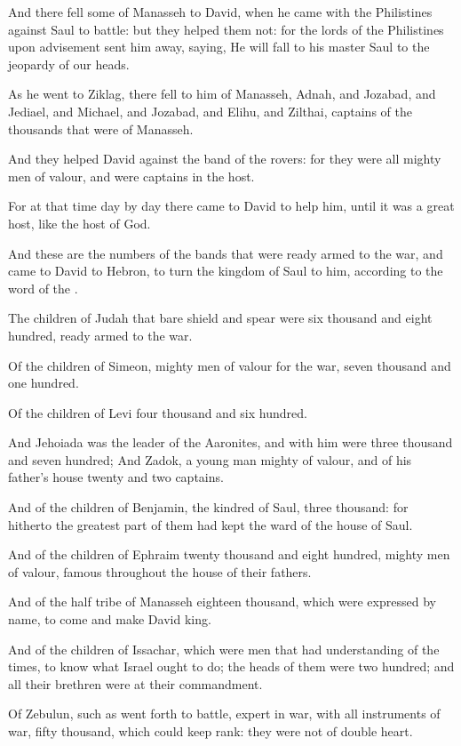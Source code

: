 \Verse And there fell some of Manasseh to David, when he came with the Philistines against Saul to battle: but they helped them not: for the lords of the Philistines upon advisement sent him away, saying, He will fall to his master Saul to the jeopardy of our heads.

\Verse As he went to Ziklag, there fell to him of Manasseh, Adnah, and Jozabad, and Jediael, and Michael, and Jozabad, and Elihu, and Zilthai, captains of the thousands that were of Manasseh.

\Verse And they helped David against the band of the rovers: for they were all mighty men of valour, and were captains in the host.

\Verse For at that time day by day there came to David to help him, until it was a great host, like the host of God.

\Verse And these are the numbers of the bands that were ready armed to the war, and came to David to Hebron, to turn the kingdom of Saul to him, according to the word of the \LORD.

\Verse The children of Judah that bare shield and spear were six thousand and eight hundred, ready armed to the war.

\Verse Of the children of Simeon, mighty men of valour for the war, seven thousand and one hundred.

\Verse Of the children of Levi four thousand and six hundred.

\Verse And Jehoiada was the leader of the Aaronites, and with him were three thousand and seven hundred; \Verse And Zadok, a young man mighty of valour, and of his father's house twenty and two captains.

\Verse And of the children of Benjamin, the kindred of Saul, three thousand: for hitherto the greatest part of them had kept the ward of the house of Saul.

\Verse And of the children of Ephraim twenty thousand and eight hundred, mighty men of valour, famous throughout the house of their fathers.

\Verse And of the half tribe of Manasseh eighteen thousand, which were expressed by name, to come and make David king.

\Verse And of the children of Issachar, which were men that had understanding of the times, to know what Israel ought to do; the heads of them were two hundred; and all their brethren were at their commandment.

\Verse Of Zebulun, such as went forth to battle, expert in war, with all instruments of war, fifty thousand, which could keep rank: they were not of double heart.

